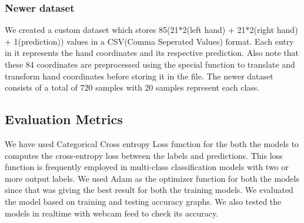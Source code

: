 \documentclass[12pt,a4paper]{report}
\begin{document}
\subsubsection{Newer dataset}
We created a custom dataset which stores 85(21*2(left hand) + 21*2(right hand) + 1(prediction)) values in a CSV(Comma Seperated Values) format. Each entry in it represents the hand coordinates and its respective prediction. Also note that these 84 coordinates are preprocessed using the special function to translate and transform hand coordinates before storing it in the file. The newer dataset consists of a total of 720 samples with 20 samples represent each class.

\subsection{Evaluation Metrics}
We have used Categorical Cross entropy Loss function for the both the models to computes the cross-entropy loss between the labels and predictions. This loss function is frequently employed in multi-class classification models with two or more output labels. We used Adam as the optimizer function for both the models since that was giving the best result for both the training models. We evaluated the model based on training and testing accuracy graphs. We also tested the models in realtime with webcam feed to check its accuracy.
\end{document}
